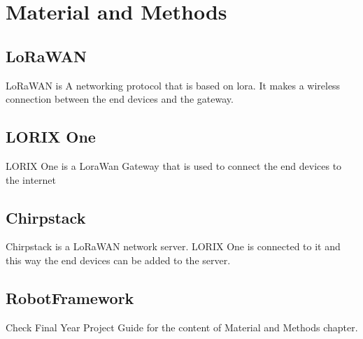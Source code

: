 
\chapter{Material and Methods}
\section{LoRaWAN}
LoRaWAN is A networking protocol that is based on \gls{lora}. It makes a wireless connection between the end devices and the gateway.
\section{LORIX One}
LORIX One is a LoraWan Gateway that is used to connect the end devices to the internet
\section{Chirpstack}
    Chirpstack is a LoRaWAN network server. LORIX One is connected to it and this way the end devices can be added to the server.
\section{RobotFramework}



Check Final Year Project Guide for the content of Material and Methods chapter.

\clearpage %
